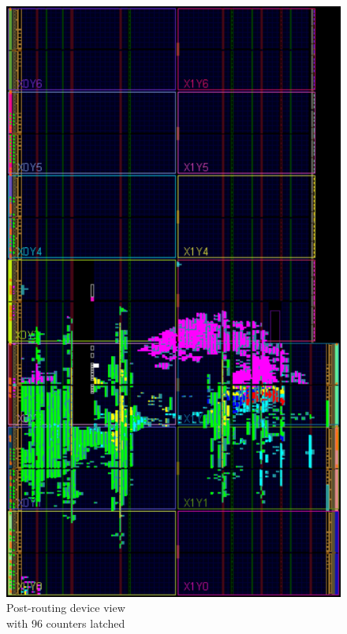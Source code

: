 \begin{figure}[H]
	\centering
	\begin{minipage}{.5\textwidth}
		\centering
		\includegraphics[width=.85\linewidth]{IMG/ch4/routed_colored_counters_clocks}
		\caption{Post-routing device view\\ with 96 counters latched}
		\label{fig:counters_clocks}
	\end{minipage}%
	\begin{minipage}{.5\textwidth}
		\centering

\end{minipage}
\end{figure}
